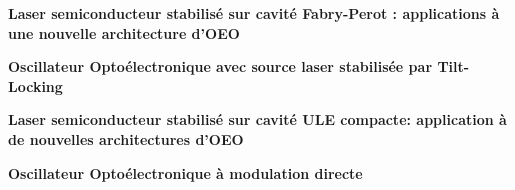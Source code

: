 \documentclass[9pt,a4paper,academicons]{altacv}
\begin{document}
\begin{fullwidth}
\vspace{-0.5em}\textbf{Laser semiconducteur stabilisé sur cavité Fabry-Perot : applications à une
nouvelle architecture d'OEO}

\divider


\vspace{-0.5em}\textbf{Oscillateur Optoélectronique avec source laser stabilisée par Tilt-Locking}

\divider
    
\vspace{-0.5em}\textbf{Laser semiconducteur stabilisé sur
	cavité ULE compacte: application à
	de nouvelles architectures d’OEO}

\divider

    
\vspace{-0.5em}\textbf{Oscillateur Optoélectronique à modulation directe}


    
    
\end{fullwidth}
\end{document}
